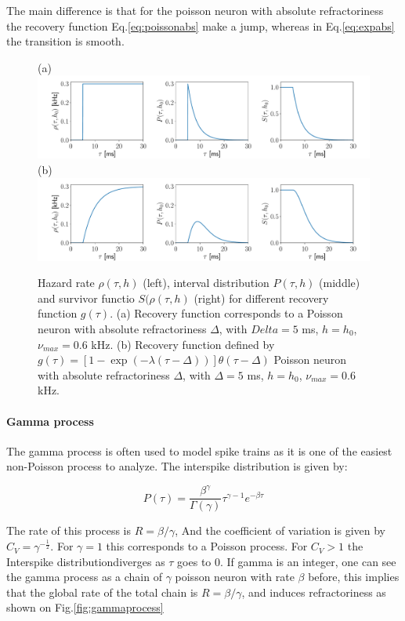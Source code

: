 \documentclass[a4paper,11pt,twoside]{article}
\numberwithin{equation}{section}
\begin{document}
The main difference is that for the poisson neuron with absolute refractoriness the recovery function Eq.\eqref{eq:poissonabs} make a jump, whereas in Eq.\eqref{eq:expabs} the transition is smooth.
\begin{figure}
	(a) \\
	\includegraphics[width=\linewidth]{poissonRHOSP.pdf}
	(b)\\
	\includegraphics[width=\linewidth]{expRHOSP.pdf}
	\caption{Hazard rate $\rho(\tau,h)$ (left), interval distribution $P(\tau,h)$ (middle) and survivor functio $S(\rho(\tau,h)$ (right) for different recovery function $g(\tau)$. (a) Recovery function corresponds to a Poisson neuron with absolute refractoriness $\Delta$, with $Delta=5$ ms, $h=h_0$, $\nu_{max}=0.6$ kHz.  (b) Recovery function defined  by $ g(\tau)=\left[1-\exp(-\lambda(\tau-\Delta))\right]\theta(\tau-\Delta)$ Poisson neuron with absolute refractoriness $\Delta$, with $\Delta=5$ ms, $h=h_0$, $\nu_{max}=0.6$ kHz.  }
	\label{fig:renewalprocess}
\end{figure}


\paragraph{Gamma process}

The gamma process is often used to model spike trains as it is one of the easiest non-Poisson process to analyze. The interspike distribution is given by:

\begin{equation}
\label{eq:gamma}
P(\tau)=\frac{\beta^\gamma}{\Gamma(\gamma)}\tau^{\gamma-1}e^{-\beta\tau}
\end{equation}

The rate of this process  is $R=\beta/\gamma$, And the coefficient of variation is given by $C_V=\gamma^{-\frac{1}{2}}$. For $\gamma=1$ this corresponds to a Poisson process. For $C_V>1$ the Interspike distributiondiverges as $\tau$ goes to $0$. If gamma is an integer, one can see the gamma process as a chain of $\gamma$ poisson neuron with rate $\beta$ before, this implies that the global rate of the total chain is $R=\beta/\gamma$, and induces refractoriness as shown on Fig.\ref{fig:gammaprocess}
\end{document}
